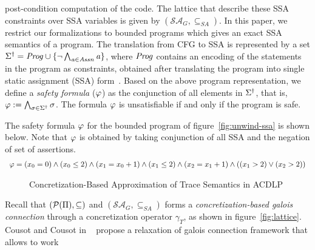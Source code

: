 {post-condition computation of the code.
The lattice that describe these SSA constraints over SSA 
variables is given by $(\mathcal{SA}_G, \subseteq_{SA})$.  
%
%
In this paper,  we restrict our formalizations to bounded programs which 
gives an exact SSA semantics of a program.  
%
%
The translation from CFG to SSA is represented by a set 
$\Sigma^\dagger=\mathit{Prog}\cup\{\neg \bigwedge_{\mathit{a}\in\mathit{Assn}} \mathit{a}\}$,
where $\mathit{Prog}$ contains an encoding of the statements in the program as
constraints, obtained after translating the program into single static 
assignment (SSA) form~\cite{ssa88,ssa1988,ssa1991}. 
%
Based on the above program representation, we define a \textit{safety formula}
($\varphi$) as the conjunction of all elements in $\Sigma^\dagger$, that is,  
$\varphi:= \bigwedge_{\sigma\in\Sigma^\dagger} \sigma$.  The formula 
$\varphi$ is unsatisfiable if and only if the program is safe.
%
\begin{example}
The safety formula $\varphi$ for the bounded program of 
figure~\ref{fig:unwind-ssa} is shown below.  Note that $\varphi$ is obtained
by taking conjunction of all SSA and the negation of set of assertions. 
%
\begin{equation}\label{eq:ssa}
\begin{array}{l}
  \formula = (x_0 = 0) \wedge
     (x_0 \leq 2) \wedge
     (x_1 = x_0 + 1) \wedge
     (x_1 \leq 2) \wedge
     (x_2 = x_1 + 1) \wedge
     ((x_1 > 2) \vee (x_2 > 2)) 
\end{array}
\end{equation}
\end{example}
%
%
\begin{figure}[htbp]
\centering
\vspace*{-0.2cm}
\caption{Concretization-Based Approximation of Trace Semantics in ACDLP
  \label{fig:syn-map}}
\end{figure}
%
Recall that $(\mathcal{P}(\Pi),\subseteq)$ and $(\mathcal{SA}_G, \subseteq_{SA})$ 
forms a \emph{concretization-based galois connection} through a concretization
operator $\gamma_T$, as shown in figure~\ref{fig:lattice}. Cousot and Cousot in
~\cite{CC92} propose a relaxation of galois connection framework that allows to work
}
